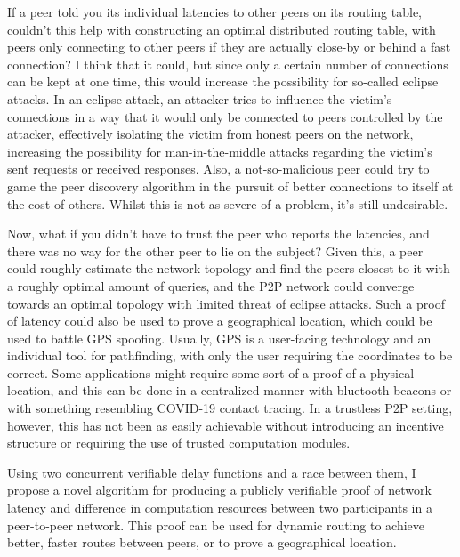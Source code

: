 If a peer told you its individual latencies to other peers on its routing table, couldn't this help with constructing an optimal distributed routing table, with peers only connecting to other peers if they are actually close-by or behind a fast connection? I think that it could, but since only a certain number of connections can be kept at one time, this would increase the possibility for so-called eclipse attacks. In an eclipse attack, an attacker tries to influence the victim's connections in a way that it would only be connected to peers controlled by the attacker, effectively isolating the victim from honest peers on the network, increasing the possibility for man-in-the-middle attacks regarding the victim's sent requests or received responses. Also, a not-so-malicious peer could try to game the peer discovery algorithm in the pursuit of better connections to itself at the cost of others. Whilst this is not as severe of a problem, it's still undesirable.

Now, what if you didn't have to trust the peer who reports the latencies, and there was no way for the other peer to lie on the subject? Given this, a peer could roughly estimate the network topology and find the peers closest to it with a roughly optimal amount of queries, and the P2P network could converge towards an optimal topology with limited threat of eclipse attacks. Such a proof of latency could also be used to prove a geographical location, which could be used to battle GPS spoofing. Usually, GPS is a user-facing technology and an individual tool for pathfinding, with only the user requiring the coordinates to be correct. Some applications might require some sort of a proof of a physical location, and this can be done in a centralized manner with bluetooth beacons or with something resembling COVID-19 contact tracing. In a trustless P2P setting, however, this has not been as easily achievable without introducing an incentive structure or requiring the use of trusted computation modules.  

Using two concurrent verifiable delay functions and a race between them, I propose a novel algorithm for producing a publicly verifiable proof of network latency and difference in computation resources between two participants in a peer-to-peer network. This proof can be used for dynamic routing to achieve better, faster routes between peers, or to prove a geographical location.
